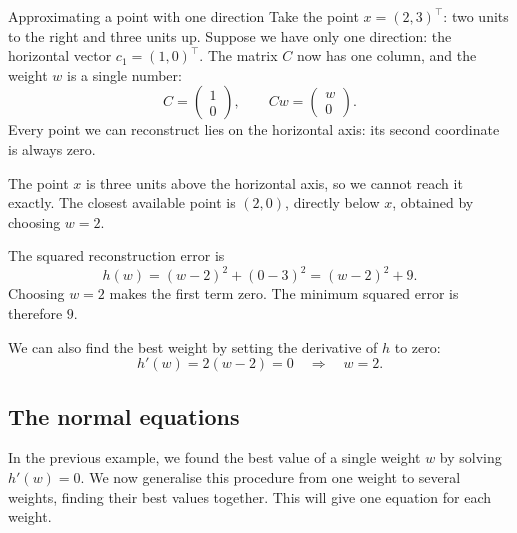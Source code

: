 \documentclass[a4paper,12pt,oneside]{report}
\begin{document}
\begin{framedexample}{Approximating a point with one direction}
Take the point $x=(2,3)^\top$: two units to the right and three units
up. Suppose we have only one direction: the horizontal vector
$c_1=(1,0)^\top$.
The matrix $C$ now has one column, and the weight $w$ is a single number:
\[
  C=\begin{pmatrix}1\\0\end{pmatrix},\qquad
  Cw=\begin{pmatrix}w\\0\end{pmatrix}.
\]
Every point we can reconstruct lies on the horizontal axis: its second
coordinate is always zero.

\begin{center}
\end{center}

The point $x$ is three units above the horizontal axis, so we cannot
reach it exactly. The closest available point is $(2,0)$, directly
below $x$, obtained by choosing $w=2$.

The squared reconstruction error is
\[
  h(w)=(w-2)^2+(0-3)^2=(w-2)^2+9.
\]
Choosing $w=2$ makes the first term zero. The minimum squared error
is therefore $9$.

We can also find the best weight by setting the derivative of $h$ to
zero:
\[
  h'(w)=2(w-2)=0
  \quad\Longrightarrow\quad w=2.
\]
\end{framedexample}

\subsection{The normal equations}

In the previous example, we found the best value of a single weight
$w$ by solving $h'(w)=0$. We now generalise this procedure from one
weight to several weights, finding their best values together.
This will give one equation for each weight.
\end{document}
